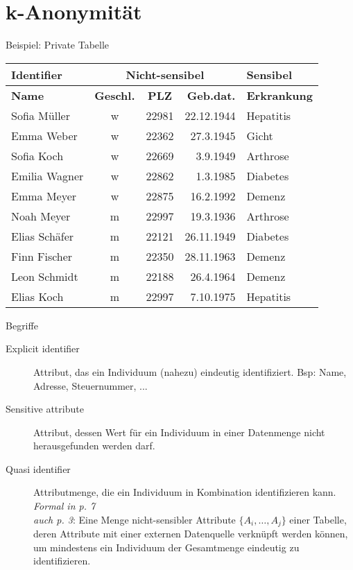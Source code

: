 \section{k-Anonymität}

\begin{frame}{Beispiel: Private Tabelle}
	\begin{center}
		\begin{tabular}{|l|c|c|r|l|}
		\hline \textbf{Identifier} & \multicolumn{3}{c|}{\textbf{Nicht-sensibel}} & \textbf{Sensibel} \\ 
		\hline \textbf{Name} & \textbf{Geschl.} & \textbf{PLZ} & \textbf{Geb.dat.} & \textbf{Erkrankung} \\
		\hline \hline Sofia Müller & w & 22981 & 22.12.1944 & Hepatitis \\ 
		\hline Emma Weber & w & 22362 & 27.3.1945 & Gicht \\
		\hline Sofia Koch & w & 22669 & 3.9.1949 & Arthrose \\ 
		\hline Emilia Wagner & w & 22862 & 1.3.1985 & Diabetes \\ 
		\hline Emma Meyer & w & 22875 & 16.2.1992 & Demenz \\  
		\hline Noah Meyer & m & 22997 & 19.3.1936 & Arthrose \\ 
		\hline Elias Schäfer & m & 22121 & 26.11.1949 & Diabetes \\ 
		\hline Finn Fischer & m & 22350 & 28.11.1963 & Demenz \\ 
		\hline Leon Schmidt & m & 22188 & 26.4.1964 & Demenz \\ 
		\hline Elias Koch & m & 22997 & 7.10.1975 & Hepatitis \\ 
		\hline 
		\end{tabular}
	\end{center}
\end{frame}

\begin{frame}{Begriffe}
	\begin{description}
	\item[Explicit identifier] Attribut, das ein Individuum (nahezu) eindeutig identifiziert. Bsp: Name, Adresse, Steuernummer, ...
	
	\item[Sensitive attribute] Attribut, dessen Wert für ein Individuum in einer Datenmenge nicht herausgefunden werden darf.
	
	\item[Quasi identifier] Attributmenge, die ein Individuum in Kombination identifizieren kann. \textit{Formal in \cite{sweeney_k_anonymity} p. 7} \\
	\textit{auch \cite{machanavajjhala_l_diversity} p. 3}: Eine Menge nicht-sensibler Attribute \(\{A_i, \dots, A_j\}\) einer Tabelle, deren Attribute mit einer externen Datenquelle verknüpft werden können, um mindestens ein Individuum der Gesamtmenge eindeutig zu identifizieren.
	\end{description}
\end{frame}

